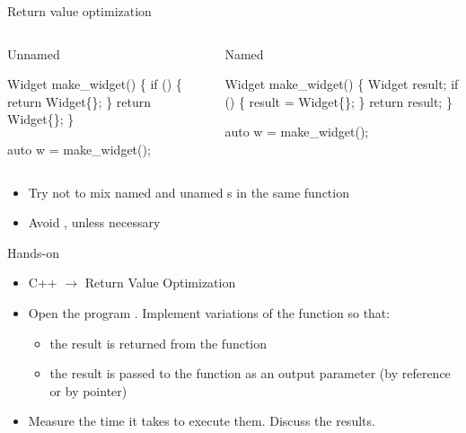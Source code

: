 \begin{frame}[fragile]{Return value optimization}

  \begin{columns}[t]

    \begin{column}{.5\textwidth}
      Unnamed
      \begin{codeblock}
Widget make\_widget()
\{
  if (\ddd) \{
    return Widget\{\};
  \}
  return Widget\{\};
\}

auto w = make\_widget();\end{codeblock}
    \end{column}

    \begin{column}{.5\textwidth}
      Named

      \begin{codeblock}
Widget make\_widget()
\{
  Widget result;
  if (\ddd) \{
    result = Widget\{\};
  \}
  return result;
\}

auto w = make\_widget();\end{codeblock}
    \end{column}
  \end{columns}

  \begin{itemize}[<2->]
  \item Try not to mix named and unamed s in the same function
  \item Avoid , unless necessary
  \end{itemize}
\end{frame}

\begin{frame}{Hands-on}

  \begin{itemize}
  \item C++ $\rightarrow$ Return Value Optimization
  \item Open the program . Implement variations of the
     function so that:
    \begin{itemize}
    \item the result is returned from the function
    \item the result is passed to the function as an output parameter (by
      reference or by pointer)
    \end{itemize}

  \item Measure the time it takes to execute them. Discuss the results.
  \end{itemize}
\end{frame}
